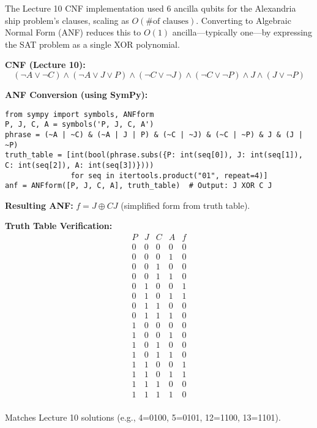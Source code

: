 The Lecture 10 CNF implementation used 6 ancilla qubits for the Alexandria
ship problem’s clauses, scaling as $O(\text{\# of clauses})$. Converting to
Algebraic Normal Form (ANF) reduces this to $O(1)$ ancilla—typically one—by
expressing the SAT problem as a single XOR polynomial.

\textbf{CNF (Lecture 10):}
\[
  (\neg A \lor \neg C) \land (\neg A \lor J \lor P) \land (\neg C \lor \neg
  J) \land (\neg C \lor \neg P) \land J \land (J \lor \neg P)
\]

\textbf{ANF Conversion (using SymPy):}
\begin{verbatim}
from sympy import symbols, ANFform
P, J, C, A = symbols('P, J, C, A')
phrase = (~A | ~C) & (~A | J | P) & (~C | ~J) & (~C | ~P) & J & (J | ~P)
truth_table = [int(bool(phrase.subs({P: int(seq[0]), J: int(seq[1]), C: int(seq[2]), A: int(seq[3])})))
               for seq in itertools.product("01", repeat=4)]
anf = ANFform([P, J, C, A], truth_table)  # Output: J XOR C J
\end{verbatim}

\textbf{Resulting ANF:} $f = J \oplus C J$ (simplified form from truth table).

\textbf{Truth Table Verification:}
\[
  \begin{array}{cccc|c}
    P & J & C & A & f \\
    \hline
    0 & 0 & 0 & 0 & 0 \\
    0 & 0 & 0 & 1 & 0 \\
    0 & 0 & 1 & 0 & 0 \\
    0 & 0 & 1 & 1 & 0 \\
    0 & 1 & 0 & 0 & 1 \\
    0 & 1 & 0 & 1 & 1 \\
    0 & 1 & 1 & 0 & 0 \\
    0 & 1 & 1 & 1 & 0 \\
    1 & 0 & 0 & 0 & 0 \\
    1 & 0 & 0 & 1 & 0 \\
    1 & 0 & 1 & 0 & 0 \\
    1 & 0 & 1 & 1 & 0 \\
    1 & 1 & 0 & 0 & 1 \\
    1 & 1 & 0 & 1 & 1 \\
    1 & 1 & 1 & 0 & 0 \\
    1 & 1 & 1 & 1 & 0 \\
  \end{array}
\]

Matches Lecture 10 solutions (e.g., 4=0100, 5=0101, 12=1100, 13=1101).

